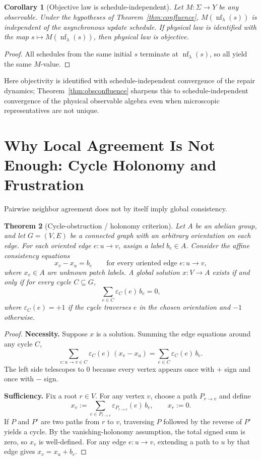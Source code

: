 \documentclass[11pt]{article}
\newtheorem{theorem}{Theorem}[section]
\newtheorem{corollary}[theorem]{Corollary}
\theoremstyle{remark}
\theoremstyle{plain}
\begin{document}
\begin{corollary}[Objective law is schedule-independent]\label{cor:objective}
Let $M:\Sigma\to Y$ be any observable. Under the hypotheses of Theorem~\ref{thm:confluence}, $M(\operatorname{nf}_\lambda(s))$ is independent of the asynchronous update schedule. If physical law is identified with the map $s\mapsto M(\operatorname{nf}_\lambda(s))$, then physical law is objective.
\end{corollary}

\begin{proof}
All schedules from the same initial $s$ terminate at $\operatorname{nf}_\lambda(s)$, so all yield the same $M$-value.
\end{proof}

Here objectivity is identified with schedule-independent convergence of the repair
dynamics; Theorem~\ref{thm:obsconfluence} sharpens this to schedule-independent convergence of the
physical observable algebra even when microscopic representatives are not unique.


\section{Why Local Agreement Is Not Enough: Cycle Holonomy and Frustration}

Pairwise neighbor agreement does not by itself imply global consistency.

\begin{theorem}[Cycle-obstruction / holonomy criterion]\label{thm:holonomy}
Let $A$ be an abelian group, and let $G=(V,E)$ be a connected graph with an arbitrary orientation on each edge. For each oriented edge $e:u\to v$, assign a label $b_e\in A$. Consider the affine consistency equations
\[
x_v - x_u = b_e
\qquad
\text{for every oriented edge } e:u\to v,
\]
where $x_v\in A$ are unknown patch labels. A global solution $x:V\to A$ exists if and only if for every cycle $C\subseteq G$,
\[
\sum_{e\in C}\varepsilon_C(e)\, b_e = 0,
\]
where $\varepsilon_C(e)=+1$ if the cycle traverses $e$ in the chosen orientation and $-1$ otherwise.
\end{theorem}

\begin{proof}
\textbf{Necessity.} Suppose $x$ is a solution. Summing the edge equations around any cycle $C$,
\[
\sum_{e:u\to v\in C}\varepsilon_C(e)\,(x_v-x_u)
=
\sum_{e\in C}\varepsilon_C(e)\,b_e.
\]
The left side telescopes to $0$ because every vertex appears once with $+$ sign and once with $-$ sign.

\textbf{Sufficiency.} Fix a root $r\in V$. For any vertex $v$, choose a path $P_{r\to v}$ and define
\[
x_v := \sum_{e\in P_{r\to v}} \varepsilon_{P_{r\to v}}(e)\, b_e,
\qquad x_r:=0.
\]
If $P$ and $P'$ are two paths from $r$ to $v$, traversing $P$ followed by the reverse of $P'$ yields a cycle. By the vanishing-holonomy assumption, the total signed sum is zero, so $x_v$ is well-defined. For any edge $e:u\to v$, extending a path to $u$ by that edge gives $x_v = x_u + b_e$.
\end{proof}
\end{document}
